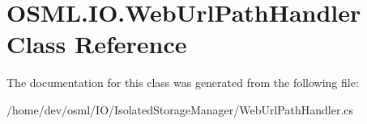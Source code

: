 \hypertarget{classOSML_1_1IO_1_1WebUrlPathHandler}{}\section{O\+S\+M\+L.\+I\+O.\+Web\+Url\+Path\+Handler Class Reference}
\label{classOSML_1_1IO_1_1WebUrlPathHandler}


The documentation for this class was generated from the following file\+:\begin{DoxyCompactItemize}
\item 
/home/dev/osml/\+I\+O/\+Isolated\+Storage\+Manager/Web\+Url\+Path\+Handler.\+cs\end{DoxyCompactItemize}
